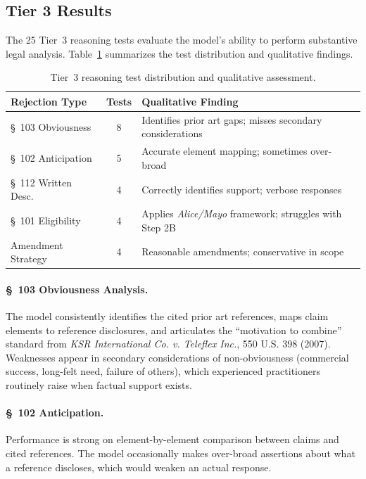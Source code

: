 \documentclass[11pt]{article}
\begin{document}
\subsection{Tier 3 Results}
\label{sec:results_tier3}

The 25 Tier~3 reasoning tests evaluate the model's ability to perform substantive legal analysis. Table~\ref{tab:tier3} summarizes the test distribution and qualitative findings.

\begin{table}[H]
\centering
\caption{Tier~3 reasoning test distribution and qualitative assessment.}
\label{tab:tier3}
\begin{tabular}{@{}lcl@{}}
\toprule
\textbf{Rejection Type} & \textbf{Tests} & \textbf{Qualitative Finding} \\
\midrule
\S~103 Obviousness & 8 & Identifies prior art gaps; misses secondary considerations \\
\S~102 Anticipation & 5 & Accurate element mapping; sometimes over-broad \\
\S~112 Written Desc. & 4 & Correctly identifies support; verbose responses \\
\S~101 Eligibility & 4 & Applies \textit{Alice/Mayo} framework; struggles with Step 2B \\
Amendment Strategy & 4 & Reasonable amendments; conservative in scope \\
\bottomrule
\end{tabular}
\end{table}

\paragraph{\S~103 Obviousness Analysis.} The model consistently identifies the cited prior art references, maps claim elements to reference disclosures, and articulates the ``motivation to combine'' standard from \textit{KSR International Co. v. Teleflex Inc.}, 550 U.S. 398 (2007). Weaknesses appear in secondary considerations of non-obviousness (commercial success, long-felt need, failure of others), which experienced practitioners routinely raise when factual support exists.

\paragraph{\S~102 Anticipation.} Performance is strong on element-by-element comparison between claims and cited references. The model occasionally makes over-broad assertions about what a reference discloses, which would weaken an actual response.
\end{document}
